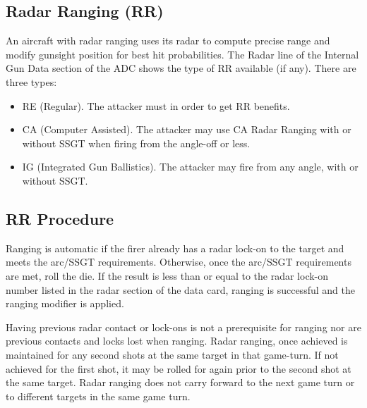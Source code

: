 \begin{advancedrules}


    \subsection{Radar Ranging (RR)} An aircraft with radar ranging uses its radar to compute precise range and modify gunsight position for best hit probabilities. The Radar line of the Internal Gun Data section of the ADC shows the type of RR available (if any). There are three types:

    \begin{itemize}

        \item RE (Regular). The attacker must  in order to get RR benefits.

        \item CA (Computer Assisted). The attacker may use CA Radar Ranging with or without SSGT when firing from the  angle-off or less.

        \item IG (Integrated Gun Ballistics). The attacker may fire from any angle, with or without SSGT.

    \end{itemize}

    \subsection{RR Procedure} Ranging is automatic if the firer already has a radar lock-on to the target and meets the arc/SSGT requirements. Otherwise, once the arc/SSGT requirements are met, roll the die. If the result is less than or equal to the radar lock-on number listed in the radar section of the data card, ranging is successful and the ranging modifier is applied.

    Having previous radar contact or lock-ons is not a prerequisite for ranging nor are previous contacts and locks lost when ranging. Radar ranging, once achieved is maintained for any second shots at the same target in that game-turn. If not achieved for the first shot, it may be rolled for again prior to the second shot at the same target. Radar ranging does not carry forward to the next game turn or to different targets in the same game turn.


\end{advancedrules}
